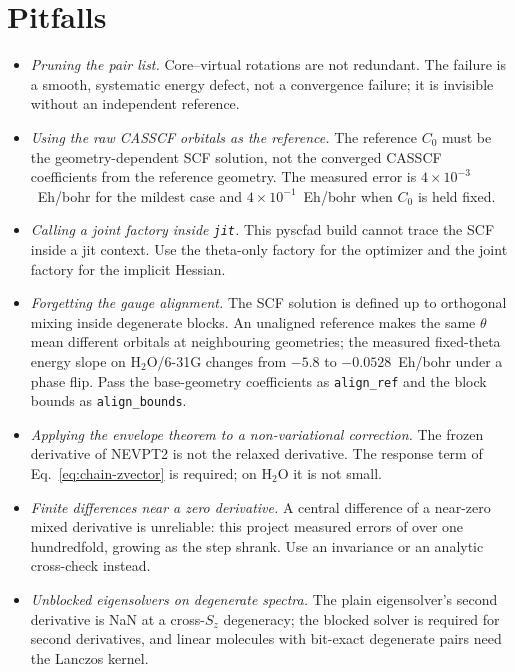 \section{Pitfalls}
\label{sec:chain-pitfalls}

\begin{itemize}
\item \emph{Pruning the pair list.}  Core--virtual rotations are not
  redundant.  The failure is a smooth, systematic energy defect, not a
  convergence failure; it is invisible without an independent
  reference.
\item \emph{Using the raw CASSCF orbitals as the reference.}  The
  reference $C_0$ must be the geometry-dependent SCF solution, not the
  converged CASSCF coefficients from the reference geometry.  The
  measured error is $4\times10^{-3}$~Eh/bohr for the mildest case and
  $4\times10^{-1}$~Eh/bohr when $C_0$ is held fixed.
\item \emph{Calling a joint factory inside \texttt{jit}.}  This
  pyscfad build cannot trace the SCF inside a jit context.  Use the
  theta-only factory for the optimizer and the joint factory for the
  implicit Hessian.
\item \emph{Forgetting the gauge alignment.}  The SCF solution is
  defined up to orthogonal mixing inside degenerate blocks.  An
  unaligned reference makes the same $\theta$ mean different orbitals
  at neighbouring geometries; the measured fixed-theta energy slope on
  H$_2$O/6-31G changes from $-5.8$ to $-0.0528$~Eh/bohr under a phase
  flip.  Pass the base-geometry coefficients as \texttt{align\_ref}
  and the block bounds as \texttt{align\_bounds}.
\item \emph{Applying the envelope theorem to a non-variational
  correction.}  The frozen derivative of NEVPT2 is not the relaxed
  derivative.  The response term of
  Eq.~\eqref{eq:chain-zvector} is required; on H$_2$O it is not small.
\item \emph{Finite differences near a zero derivative.}  A central
  difference of a near-zero mixed derivative is unreliable: this
  project measured errors of over one hundredfold, growing as the step
  shrank.  Use an invariance or an analytic cross-check instead.
\item \emph{Unblocked eigensolvers on degenerate spectra.}  The plain
  eigensolver's second derivative is NaN at a cross-$S_z$ degeneracy;
  the blocked solver is required for second derivatives, and linear
  molecules with bit-exact degenerate pairs need the Lanczos kernel.
\end{itemize}

